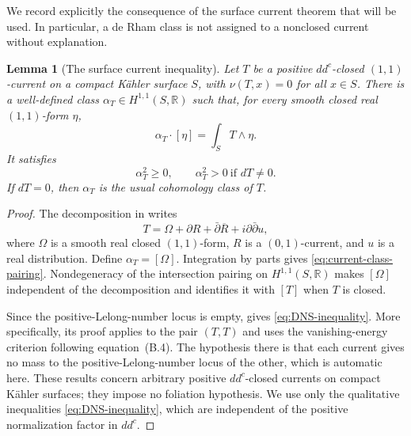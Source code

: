\documentclass[11pt]{amsart}
\newtheorem{lemma}[theorem]{Lemma}
\theoremstyle{definition}
\theoremstyle{remark}
\numberwithin{equation}{section}
\begin{document}
We record explicitly the consequence of the surface current theorem
that will be used.  In particular, a de Rham class is not assigned
to a nonclosed current without explanation.

\begin{lemma}[The surface current inequality]
\label{lem:surface-current-inequality}
Let $T$ be a positive $dd^c$-closed $(1,1)$-current on a compact
K\"ahler surface $S$, with $\nu(T,x)=0$ for all $x\in S$.
There is a well-defined class $\alpha_T\in H^{1,1}(S,\mathbb R)$
such that, for every smooth closed real $(1,1)$-form $\eta$,
\begin{equation}
\label{eq:current-class-pairing}
 \alpha_T\cdot[\eta]=\int_S T\wedge\eta.
\end{equation}
It satisfies
\begin{equation}
\label{eq:DNS-inequality}
 \alpha_T^2\geq0,
 \qquad \alpha_T^2>0\ \text{if }dT\ne0.
\end{equation}
If $dT=0$, then $\alpha_T$ is the usual cohomology class of $T$.
\end{lemma}

\begin{proof}
The decomposition in \cite[\S2.1, equation~(2.1), and Lemma~B.2]{DNS22}
writes
\[
 T=\Omega+\partial R+\bar\partial\overline R
          +i\partial\bar\partial u,
\]
where $\Omega$ is a smooth real closed $(1,1)$-form, $R$ is a
$(0,1)$-current, and $u$ is a real distribution.  Define
$\alpha_T=[\Omega]$.  Integration by parts gives
\eqref{eq:current-class-pairing}.  Nondegeneracy of the intersection
pairing on $H^{1,1}(S,\mathbb R)$ makes $[\Omega]$ independent of
the decomposition and identifies it with $[T]$ when $T$ is closed.

Since the positive-Lelong-number locus is empty,
\cite[Corollary~2.4 and its proof]{DNS22} gives
\eqref{eq:DNS-inequality}.  More specifically, its proof applies
\cite[Theorem~2.2(2)]{DNS22} to the pair $(T,T)$ and uses the
vanishing-energy criterion following equation~(B.4).  The hypothesis
there is that each current gives no mass to the positive-Lelong-number
locus of the other, which is automatic here.  These results concern
arbitrary positive $dd^c$-closed currents on compact K\"ahler surfaces;
they impose no foliation hypothesis.  We use only the qualitative
inequalities \eqref{eq:DNS-inequality}, which are independent of
the positive normalization factor in $dd^c$.
\end{proof}
\end{document}

